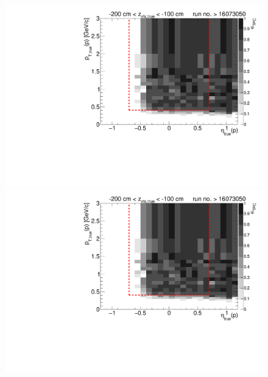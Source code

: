 \begin{figure}[hb]
{		\includegraphics[width=\linewidth,page=16]{graphics/eff/Eff2D_TPC_proton_Plus_RunRange2.pdf}\\
		\includegraphics[width=\linewidth,page=18]{graphics/eff/Eff2D_TPC_proton_Plus_RunRange2.pdf}
	}%
\end{figure}
